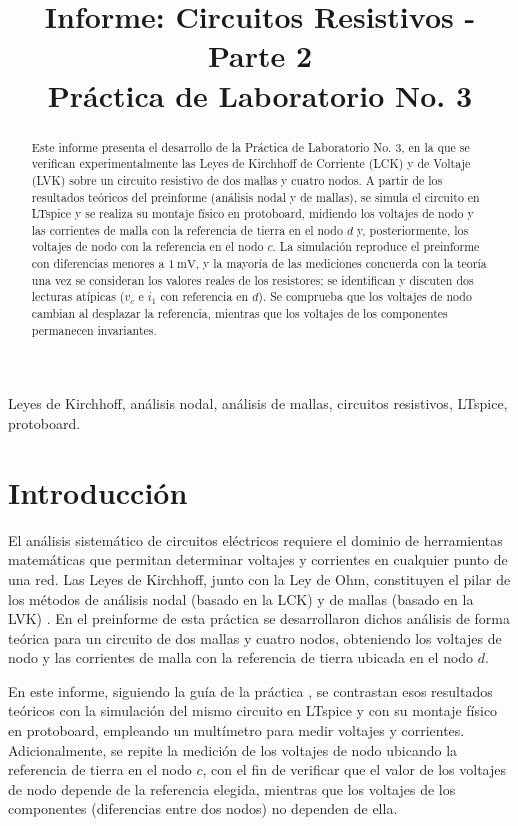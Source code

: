\documentclass[conference,10pt]{IEEEtran}
\title{Informe: Circuitos Resistivos - Parte 2\\
Práctica de Laboratorio No. 3}
\author{
  \IEEEauthorblockN{Maria Paula Mejía Vásquez, Cristian Alejandro Guarin Marin}
  \IEEEauthorblockA{
    Ingeniería Electrónica y de Telecomunicaciones\\
    Circuitos Eléctricos I -- Universidad de Antioquia\\
    Periodo 2026-2\\
    paula.mejia3@udea.edu.co, cristian.guarinm@udea.edu.co
  }
}
\begin{document}
\maketitle

\begin{abstract}
Este informe presenta el desarrollo de la Práctica de Laboratorio No. 3, en la que se verifican experimentalmente las Leyes de Kirchhoff de Corriente (LCK) y de Voltaje (LVK) sobre un circuito resistivo de dos mallas y cuatro nodos. A partir de los resultados teóricos del preinforme (análisis nodal y de mallas), se simula el circuito en LTspice y se realiza su montaje físico en protoboard, midiendo los voltajes de nodo y las corrientes de malla con la referencia de tierra en el nodo $d$ y, posteriormente, los voltajes de nodo con la referencia en el nodo $c$. La simulación reproduce el preinforme con diferencias menores a $1~\mathrm{mV}$, y la mayoría de las mediciones concuerda con la teoría una vez se consideran los valores reales de los resistores; se identifican y discuten dos lecturas atípicas ($v_c$ e $i_1$ con referencia en $d$). Se comprueba que los voltajes de nodo cambian al desplazar la referencia, mientras que los voltajes de los componentes permanecen invariantes.
\end{abstract}

\begin{IEEEkeywords}
Leyes de Kirchhoff, análisis nodal, análisis de mallas, circuitos resistivos, LTspice, protoboard.
\end{IEEEkeywords}

\section{Introducción}
El análisis sistemático de circuitos eléctricos requiere el dominio de herramientas matemáticas que permitan determinar voltajes y corrientes en cualquier punto de una red. Las Leyes de Kirchhoff, junto con la Ley de Ohm, constituyen el pilar de los métodos de análisis nodal (basado en la LCK) y de mallas (basado en la LVK) \cite{texto}. En el preinforme de esta práctica \cite{preinforme} se desarrollaron dichos análisis de forma teórica para un circuito de dos mallas y cuatro nodos, obteniendo los voltajes de nodo y las corrientes de malla con la referencia de tierra ubicada en el nodo $d$.

En este informe, siguiendo la guía de la práctica \cite{guia}, se contrastan esos resultados teóricos con la simulación del mismo circuito en LTspice y con su montaje físico en protoboard, empleando un multímetro para medir voltajes y corrientes. Adicionalmente, se repite la medición de los voltajes de nodo ubicando la referencia de tierra en el nodo $c$, con el fin de verificar que el valor de los voltajes de nodo depende de la referencia elegida, mientras que los voltajes de los componentes (diferencias entre dos nodos) no dependen de ella.
\end{document}
